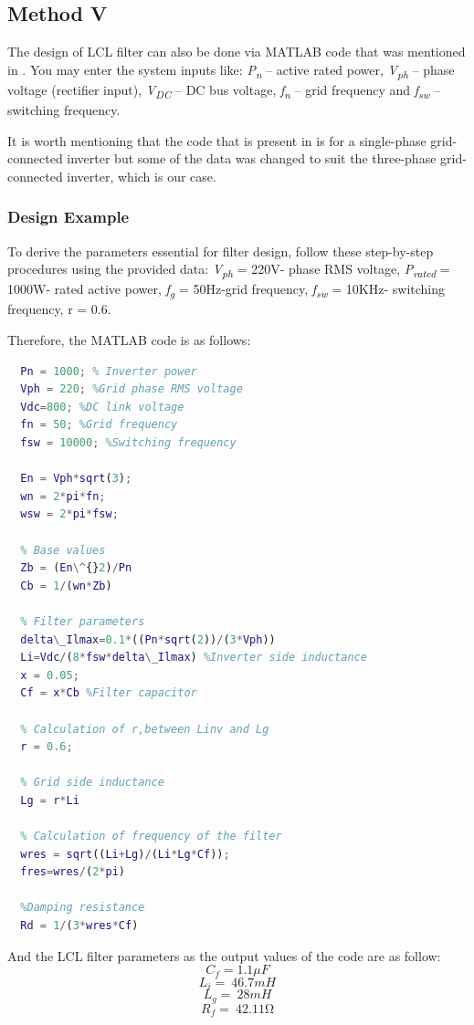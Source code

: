 \documentclass[12pt,a4paper]{book}
\begin{document}
\subsection{Method V}
The design of LCL filter can also be done via MATLAB code that was mentioned in \cite{lcl2014}. You may enter the system inputs like: \emph{P\textsubscript{n}} -- active rated power, \emph{V\textsubscript{ph}} -- phase voltage (rectifier input), \emph{V\textsubscript{DC}} -- DC bus voltage, \emph{f\textsubscript{n}} -- grid frequency and \emph{f\textsubscript{sw}} -- switching frequency.

It is worth mentioning that the code that is present in \cite{lcl2014} is for a single-phase grid-connected inverter but some of the data was changed to suit the three-phase grid-connected inverter, which is our case.

\subsubsection{Design Example}
To derive the parameters essential for filter design, follow these step-by-step procedures using the provided data: \emph{V\textsubscript{ph}} = 220V- phase RMS voltage, \emph{P\textsubscript{rated}} = 1000W- rated active power, \emph{f\textsubscript{g}} = 50Hz-grid frequency, \emph{f\textsubscript{sw}} = 10KHz- switching frequency, r = 0.6.

Therefore, the MATLAB code is as follows:
\begin{lstlisting}[language=Matlab, label=lst:matlabcode]
  % System parameters
  Pn = 1000; % Inverter power
  Vph = 220; %Grid phase RMS voltage
  Vdc=800; %DC link voltage
  fn = 50; %Grid frequency
  fsw = 10000; %Switching frequency
  
  En = Vph*sqrt(3);
  wn = 2*pi*fn;
  wsw = 2*pi*fsw;
  
  % Base values
  Zb = (En\^{}2)/Pn
  Cb = 1/(wn*Zb)

  % Filter parameters
  delta\_Ilmax=0.1*((Pn*sqrt(2))/(3*Vph))
  Li=Vdc/(8*fsw*delta\_Ilmax) %Inverter side inductance
  x = 0.05;
  Cf = x*Cb %Filter capacitor

  % Calculation of r,between Linv and Lg
  r = 0.6;

  % Grid side inductance
  Lg = r*Li

  % Calculation of frequency of the filter
  wres = sqrt((Li+Lg)/(Li*Lg*Cf));
  fres=wres/(2*pi)
  
  %Damping resistance
  Rd = 1/(3*wres*Cf)
\end{lstlisting}
And the LCL filter parameters as the output values of the code are as follow:
\[C_{f} = 1.1\mu F\]
\[L_{i} = \ 46.7mH\]
\[L_{g} = \ 28mH\]
\[R_{f} = \ 42.11\mathrm{\Omega}\]
\end{document}
